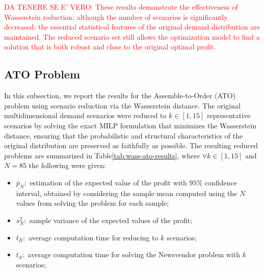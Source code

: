 \documentclass[a4paper,12pt]{article}
\begin{document}
	\label{tab:wass-nv-results}
	
	
	\textcolor{red}{DA TENERE SE E' VERO: These results demonstrate the effectiveness of Wasserstein reduction: although the number of scenarios is significantly decreased, the essential statistical features of the original demand distribution are maintained. The reduced scenario set still allows the optimization model to find a solution that is both robust and close to the original optimal profit.}	
	
	\subsection{ATO Problem}
	
	In this subsection, we report the results for the Assemble-to-Order (ATO) problem using scenario reduction via the Wasserstein distance. The original multidimensional demand scenarios were reduced to $k \in [1,15]$ representative scenarios by solving the exact MILP formulation that minimizes the Wasserstein distance, ensuring that the probabilistic and structural characteristics of the original distribution are preserved as faithfully as possible. The resulting reduced problems are summarized in Table\ref{tab:wass-ato-results}, where $\forall k \in [1,15]$  and $N = 85 $ the following were given:
	\begin{itemize}
		\item $\bar{p}_{N}:$ estimation of the expected value of the profit with $95\%$ confidence interval, obtained by considering the sample mean computed using the $N$ values from solving the problem for each sample;
		\item $s^{2}_{N}:$ sample variance of the expected values of the profit;
		\item $t_{R}:$ average computation time for reducing to $k$ scenarios;
		\item $t_{S}:$ average computation time for solving the Newsvendor problem with $k$ scenarios;
	\end{itemize}~
	
\end{document}
